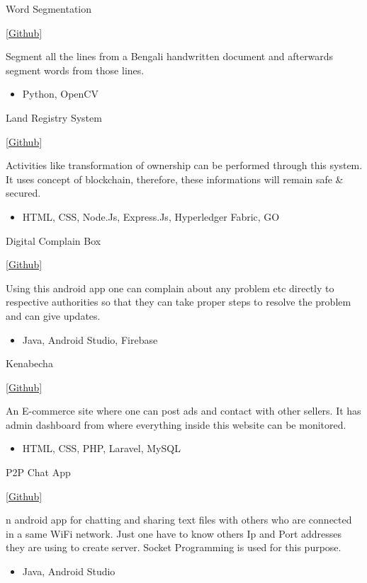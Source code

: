 \documentclass[a4paper,10pt]{article}
\newlength{\cvcolumngapwidth}
\newlength{\cvleftcolumnwidth}
\newlength{\cvrightcolumnwidth}
\newcommand{\cvtitlestyle}[1]{{\large\cvtitlefont\textcolor{cvtitlecolor}{#1}}}
\newcommand{\cvheadingstyle}[1]{{\normalsize\cvheadingfont\textcolor{cvheadingcolor}{#1}}}
\newlength{\cvafteritemskipamount}
\newlength{\cvaftertitleskipamount}
\newlength{\cvparskip}
\newcommand{\cvitem}[2]{
    \begin{minipage}[t]{\cvleftcolumnwidth}
        \raggedleft #1
    \end{minipage}%
    \hspace{\cvcolumngapwidth}%
    \begin{minipage}[t]{\cvrightcolumnwidth}
        \setlength{\parskip}{\cvparskip} #2
    \end{minipage}

    \vspace{\cvafteritemskipamount}
}
\newcommand{\cvtitle}[1]{
    \cvtitlestyle{#1}

    \vspace{\cvaftertitleskipamount}
    \vspace{-\cvparskip}
}
\begin{document}
\cvitem{
    \cvheadingstyle{Word Segmentation}
}{
    \cvtitle{\href{https://github.com/Partha-Sarker/Bangla-handwritten-word-segmentation-from-document}{[Github]}}   
    Segment all the lines from a Bengali handwritten document and afterwards segment words from those lines.
    \begin{itemize}[leftmargin=*]
        \item Python, OpenCV
    \end{itemize}
}
\cvitem{
    \cvheadingstyle{Land Registry System}
}{
    \cvtitle{\href{https://github.com/diptodeydip/Land_Registry_using_Hyperledger_Fabric}{[Github]}}
    Activities like transformation of ownership can be performed through this system. It uses concept of blockchain, therefore, these informations will remain safe & secured.
    \begin{itemize}[leftmargin=*]
        \item HTML, CSS, Node.Js, Express.Js, Hyperledger Fabric, GO
    \end{itemize}
}
\cvitem{
    \cvheadingstyle{Digital Complain Box }
}{
    \cvtitle{\href{https://github.com/diptodeydip/DigitalComplainBox-250}{[Github]}}
    Using this android app one can complain about any problem etc directly to respective authorities so that they can take proper steps to resolve the problem and can give updates.
    \begin{itemize}[leftmargin=*]
        \item Java, Android Studio, Firebase
    \end{itemize}
}
\cvitem{
    \cvheadingstyle{Kenabecha }
}{
    \cvtitle{\href{https://github.com/diptodeydip/DBMS-project}{[Github]}}
    An E-commerce site where one can post ads and contact with other sellers. It has admin dashboard from where everything inside this website can be monitored.
    \begin{itemize}[leftmargin=*]
        \item HTML, CSS, PHP, Laravel, MySQL
    \end{itemize}
}
\cvitem{
    \cvheadingstyle{P2P Chat App }
}{
    \cvtitle{\href{https://github.com/diptodeydip/P2p_chat_app_using_Socket_Programming}{[Github]}}
    n android app for chatting and sharing text files with others who are connected in a same WiFi network. Just one have to know others Ip and Port addresses they are using to create server. Socket Programming is used for this purpose.
    \begin{itemize}[leftmargin=*]
        \item Java, Android Studio
    \end{itemize}
}
\end{document}
